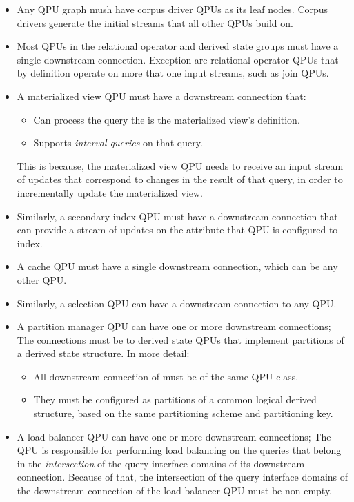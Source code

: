 \begin{itemize}
  \item Any QPU graph mush have corpus driver QPUs as its leaf nodes.
  Corpus drivers generate the initial streams that all other QPUs build on.

  \item Most QPUs in the relational operator and derived state groups must have a single downstream connection.
  Exception are relational operator QPUs that by definition operate on more that one input streams, such as join QPUs.

  \item A materialized view QPU must have a downstream connection that:
  \begin{itemize}
    \item Can process the query the is the materialized view's definition.
    \item Supports \textit{interval queries} on that query.
  \end{itemize}
  This is because, the materialized view QPU needs to receive an input stream of updates that correspond to changes in
  the result of that query, in order to incrementally update the materialized view.

  \item Similarly, a secondary index QPU must have a downstream connection that can provide a stream of updates on the
  attribute that QPU is configured to index.

  \item A cache QPU must have a single downstream connection, which can be any other QPU.

  \item Similarly, a selection QPU can have a downstream connection to any QPU.

  \item A partition manager QPU can have one or more downstream connections;
  The connections must be to derived state QPUs that implement partitions of a derived state structure.
  In more detail:
  \begin{itemize}
    \item All downstream connection of must be of the same QPU class.

    \item They must be configured as partitions of a common logical derived structure, based on the same partitioning
    scheme and partitioning key.
  \end{itemize}

  \item A load balancer QPU can have one or more downstream connections;
  The QPU is responsible for performing load balancing on the queries that belong in the \textit{intersection} of the
  query interface domains of its downstream connection.
  Because of that, the intersection of the query interface domains of the downstream connection of the load balancer
  QPU must be non empty.
\end{itemize}

